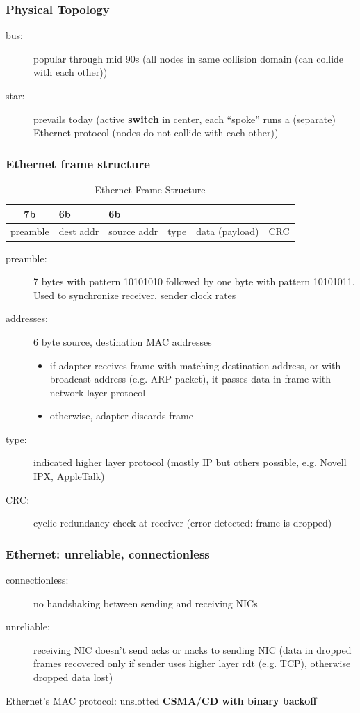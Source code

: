 \subsubsection{Physical Topology}
\begin{description}
	\item[bus:] popular through mid 90s (all nodes in same collision domain (can collide with each other))
	\item[star:] prevails today (active \textbf{switch} in center, each ``spoke'' runs a (separate) Ethernet protocol (nodes do not collide with each other))
\end{description}
\subsubsection{Ethernet frame structure}
\begin{table}[H]
	\centering
	\caption{Ethernet Frame Structure}
	\begin{tabular}{c|p{1cm}|p{1cm}|c|p{1cm}|c}
		7b & 6b & 6b &&&\\
		\midrule
		preamble & dest addr & source addr & type & data (payload) & CRC
	\end{tabular}
\end{table}
\begin{description}
	\item[preamble:] 7 bytes with pattern 10101010 followed by one byte with pattern 10101011. Used to synchronize receiver, sender clock rates
	\item[addresses:] 6 byte source, destination MAC addresses
	\begin{itemize}
		\item if adapter receives frame with matching destination address, or with broadcast address (e.g. ARP packet), it passes data in frame with network layer protocol
		\item otherwise, adapter discards frame
	\end{itemize}
	\item[type:] indicated higher layer protocol (mostly IP but others possible, e.g. Novell IPX, AppleTalk)
	\item[CRC:] cyclic redundancy check at receiver (error detected: frame is dropped)
\end{description}
\subsubsection{Ethernet: unreliable, connectionless}
\begin{description}
	\item[connectionless:] no handshaking between sending and receiving NICs
	\item[unreliable:] receiving NIC doesn't send acks or nacks to sending NIC (data in dropped frames recovered only if sender uses higher layer rdt (e.g. TCP), otherwise dropped data lost)
\end{description}
Ethernet's MAC protocol: unslotted \textbf{CSMA/CD with binary backoff}
